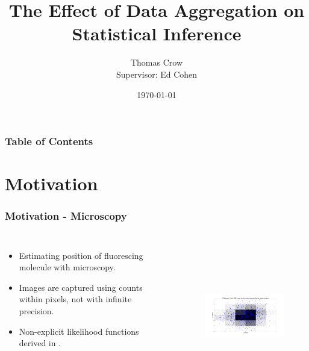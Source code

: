 \documentclass[11pt]{beamer}
\title[Data Aggregation]{The Effect of Data Aggregation on Statistical Inference}
\author[Thomas Crow]{\Large {Thomas Crow \\ \footnotesize Supervisor: Ed Cohen}}
\date{\today}
\begin{document}
\maketitle

\begin{frame}
\frametitle{Table of Contents}
\tableofcontents
\end{frame}

\section{Motivation}
\begin{frame}
	\frametitle{Motivation - Microscopy}

	\begin{columns}

		\begin{itemize}
			\item Estimating position of fluorescing molecule with microscopy.
			\item Images are captured using counts within pixels, not with infinite precision.
			\item Non-explicit likelihood functions derived in \cite{localization_accuracy}.
		\end{itemize}
		\begin{figure}[!h]
			\includegraphics[height=6.5cm, width=6.5cm]{2d_pixel.pdf}
			\centering
		\end{figure}
		
	\end{columns}
\end{frame}
\end{document}

